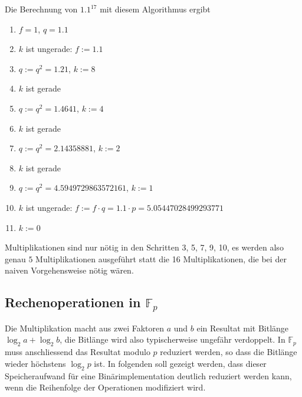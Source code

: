 \begin{beispiel}
Die Berechnung von $1.1^{17}$ mit diesem Algorithmus ergibt
\begin{enumerate}
\item $f=1$, $q=1.1$
\item $k$ ist ungerade: $f:=1.1$
\item $q:=q^2=1.21$, $k := 8$
\item $k$ ist gerade
\item $q:=q^2=1.4641$, $k := 4$
\item $k$ ist gerade
\item $q:=q^2=2.14358881$, $k := 2$
\item $k$ ist gerade
\item $q:=q^2=4.5949729863572161$, $k := 1$
\item $k$ ist ungerade: $f:=f\cdot q=1.1\cdot p = 5.05447028499293771$
\item $k:=0$
\end{enumerate}
Multiplikationen sind nur nötig in den Schritten 3, 5, 7, 9, 10, es
werden also genau $5$ Multiplikationen ausgeführt statt die
16 Multiplikationen, die bei der naiven Vorgehensweise nötig wären.
\end{beispiel}


\subsection{Rechenoperationen in $\mathbb{F}_p$
\label{buch:subsection:rechenoperationen-in-fp}}
Die Multiplikation macht aus zwei Faktoren $a$ und $b$ ein 
Resultat mit Bitlänge $\log_2 a+\log_2 b$, die Bitlänge wird
also typischerweise ungefähr verdoppelt.
In $\mathbb{F}_p$ muss anschliessend das Resultat modulo $p$
reduziert werden, so dass die Bitlänge wieder höchstens
$\log_2p$ ist.
In folgenden soll gezeigt werden, dass dieser Speicheraufwand 
für eine Binärimplementation deutlich reduziert werden kann,
wenn die Reihenfolge der Operationen modifiziert wird.

